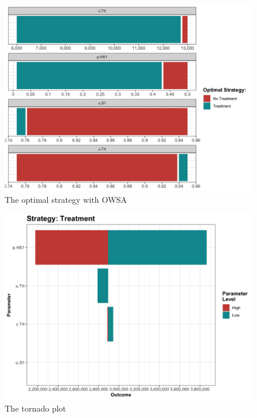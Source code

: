 \documentclass[]{article}
\begin{document}
\begin{figure}
\centering
\includegraphics{../figs/05a_optimal-owsa-nmb.png}
\caption{The optimal strategy with OWSA
\label{fig:05a_optimal-owsa-nmb}}
\end{figure}

\begin{figure}
\centering
\includegraphics{../figs/05a_tornado-Treatment-nmb.png}
\caption{The tornado plot \label{fig:05a_tornado-Treatment-nmb}}
\end{figure}
\end{document}
